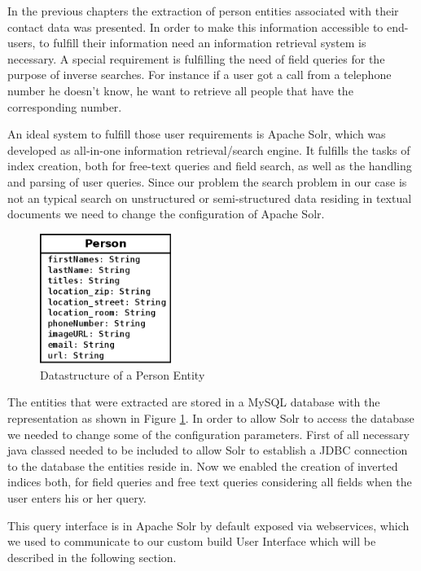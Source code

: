 \documentclass[11pt,titlepage,oneside,openany]{article}
\begin{document}
In the previous chapters the extraction of person entities associated with their contact data was presented. In order to make this information accessible to end-users, to fulfill their information need an information retrieval system is necessary. A special requirement is fulfilling the need of field queries for the purpose of inverse searches. For instance if a user got a call from a telephone number he doesn't know, he want to retrieve all people that have the corresponding number.

An ideal system to fulfill those user requirements is Apache Solr, which was developed as all-in-one information retrieval/search engine. It fulfills the tasks of index creation, both for free-text queries and field search, as well as the handling and parsing of user queries.  Since our problem the search problem in our case is not an typical search on unstructured or semi-structured data residing in textual documents we need to change the configuration of Apache Solr.

\begin{figure}
  \begin{center}
   \includegraphics[width=0.38\textwidth]{figures/Person.png}
  \end{center}
  \caption{Datastructure of a Person Entity}
    \label{fig:person}
\end{figure}

The entities that were extracted are stored in a MySQL database with the representation as shown in Figure \ref{fig:person}.  In order to allow Solr to access the database we needed to change some of the configuration parameters. First of all necessary java classed needed to be included to allow Solr to establish a JDBC connection to the database the entities reside in. Now we enabled the creation of inverted indices both, for field queries and free text queries considering all fields when the user enters his or her query. 

This query interface is in Apache Solr by default exposed via webservices, which we used to communicate to our custom build User Interface which will be described in the following section.
\end{document}
